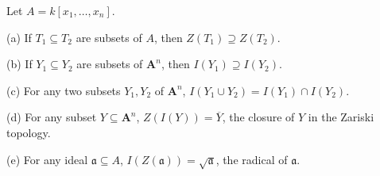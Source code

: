 Let $A = k[x_1, \ldots, x_n]$.

(a) If $T_1 \subseteq T_2$ are subsets of $A$, then $Z(T_1) \supseteq Z(T_2)$.

(b) If $Y_1 \subseteq Y_2$ are subsets of $\mathbf{A}^n$, then $I(Y_1) \supseteq I(Y_2)$.

(c) For any two subsets $Y_1, Y_2$ of $\mathbf{A}^n$, $I(Y_1 \cup Y_2) = I(Y_1) \cap I(Y_2)$.

(d) For any subset $Y \subseteq \mathbf{A}^n$, $Z(I(Y)) = \overline{Y}$, the closure of $Y$ in the Zariski topology.

(e) For any ideal $\mathfrak{a} \subseteq A$, $I(Z(\mathfrak{a})) = \sqrt{\mathfrak{a}}$, the radical of $\mathfrak{a}$.
